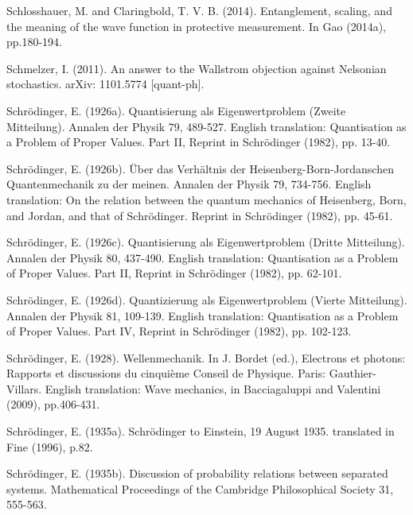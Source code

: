 \begin{thebibliography}{}
\bibitem{} Schlosshauer, M. and Claringbold, T. V. B. (2014). Entanglement, scaling, and the meaning of the wave function in protective measurement. In Gao (2014a), pp.180-194. 

\bibitem{} Schmelzer, I. (2011). An answer to the Wallstrom objection against Nelsonian stochastics. arXiv: 1101.5774 [quant-ph]. 


\bibitem{} Schr\"{o}dinger, E. (1926a). Quantisierung als Eigenwertproblem (Zweite Mitteilung). Annalen der Physik 79, 489-527. English translation: Quantisation as a Problem of Proper Values. Part II, Reprint in Schr\"{o}dinger (1982), pp. 13-40.

\bibitem{} Schr\"{o}dinger, E. (1926b). \"{U}ber das Verh\"{a}ltnis der Heisenberg-Born-Jordanschen Quantenmechanik zu der meinen. Annalen der Physik 79, 734-756. English translation: On the relation between the quantum mechanics of Heisenberg, Born, and Jordan, and that of Schr\"{o}dinger. Reprint in Schr\"{o}dinger (1982), pp. 45-61.

\bibitem{} Schr\"{o}dinger, E. (1926c). Quantisierung als Eigenwertproblem (Dritte Mitteilung). Annalen der Physik 80, 437-490. English translation: Quantisation as a Problem of Proper Values. Part II, Reprint in Schr\"{o}dinger (1982), pp. 62-101.

\bibitem{} Schr\"{o}dinger, E. (1926d). Quantizierung als Eigenwertproblem (Vierte Mitteilung). Annalen der Physik 81, 109-139. English translation: Quantisation as a Problem of Proper Values. Part IV, Reprint in Schr\"{o}dinger (1982), pp. 102-123.

\bibitem{} Schr\"{o}dinger, E. (1928). Wellenmechanik. In J. Bordet (ed.), Electrons et photons: Rapports et discussions du cinquième Conseil de Physique. Paris: Gauthier-Villars. English translation: Wave mechanics, in Bacciagaluppi and Valentini (2009), pp.406-431.


\bibitem{} Schr\"{o}dinger, E. (1935a). Schr\"{o}dinger to Einstein, 19 August 1935. translated in Fine (1996), p.82.

\bibitem{} Schr\"{o}dinger, E. (1935b). Discussion of probability relations between separated systems. Mathematical Proceedings of the Cambridge Philosophical Society 31, 555-563.


\end{thebibliography}
